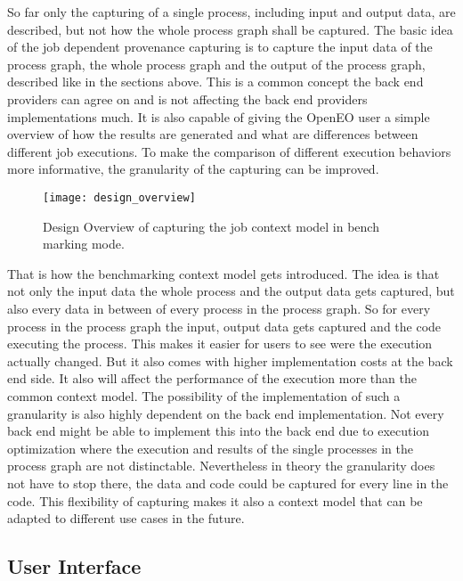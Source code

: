 \documentclass[draft,final]{vutinfth} %
\begin{document}
So far only the capturing of a single process, including input and output data, are described, but not how the whole process graph shall be captured. The basic idea of the job dependent provenance capturing is to capture the input data of the process graph, the whole process graph and the output of the process graph, described like in the sections above. This is a common concept the back end providers can agree on and is not affecting the back end providers implementations much. It is also capable of giving the OpenEO user a simple overview of how the results are generated and what are differences between different job executions. 
To make the comparison of different execution behaviors more informative, the granularity of the capturing can be improved. 

\begin{figure}[h]
	\centering
	\texttt{[image: design\_overview]}
	\caption{Design Overview of capturing the job context model in bench marking mode.}
	\label{fig:design_overview} %
\end{figure}
That is how the benchmarking context model gets introduced. The idea is that not only the input data the whole process and the output data gets captured, but also every data in between of every process in the process graph. So for every process in the process graph the input, output data gets captured and the code executing the process. This makes it easier for users to see were the execution actually changed. But it also comes with higher implementation costs at the back end side. It also will affect the performance of the execution more than the common context model. The possibility of the implementation of such a granularity is also highly dependent on the back end implementation. Not every back end might be able to implement this into the back end due to execution optimization where the execution and results of the single  processes in the process graph are not distinctable. Nevertheless in theory the granularity does not have to stop there, the data and code could be captured for every line in the code. This flexibility of capturing makes it also a context model that  can be adapted to different use cases in the future.  

\subsection{User Interface}\label{Design:User Interface}
\end{document}
